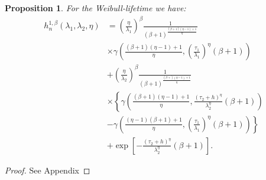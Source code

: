 \documentclass[10pt,a4paper]{amsart}
\newtheorem{proposition}{Proposition}
\begin{document}
\begin{proposition}
For the Weibull-lifetime we have:
\begin{align*}
h_{n}^{1,\beta}(\lambda_1,\lambda_2,\eta)&=\left(\frac{\eta}{\lambda_1}\right)^{\beta}\frac{1}{(\beta+1)^{\frac{(\beta+1)(\eta-1)+1}{\eta}}}
\\
&\times \gamma\left(\frac{(\beta+1)(\eta-1)+1}{\eta}, \left(\frac{\tau_1}{\lambda_1}\right)^{\eta}(\beta+1)\right)
\\
&+\left(\frac{\eta}{\lambda_2}\right)^{\beta}\frac{1}{(\beta+1)^{\frac{(\beta+)(\eta-1)+1}{\eta}}}
\\
&\times \left\{\gamma\left(\frac{(\beta+1)(\eta-1)+1}{\eta},\frac{\left(\tau_2+h\right)^{\eta}}{\lambda_2^{\eta}}(\beta+1)\right)\right.
\\
&-\left. \gamma\left(\frac{(\eta-1)(\beta+1)+1}{\eta},\left(\frac{\tau_1}{\lambda_1}\right)^{\eta}(\beta+1)\right) \right\}
\\
&+\exp\left[-\frac{\left(\tau_2+h\right)^{\eta}}{\lambda_2^{\eta}}(\beta+1)\right].
\end{align*}

\label{thm:Hn}
\end{proposition}

\begin{proof}
See Appendix
\end{proof}
\end{document}
